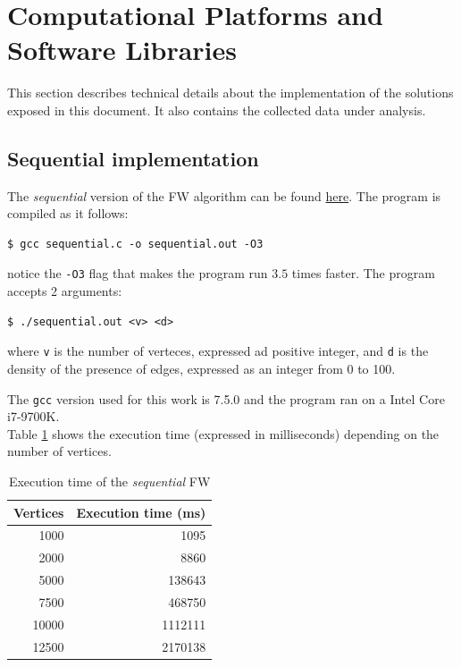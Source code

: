 \section{Computational Platforms and Software Libraries}
This section describes technical details about the implementation of the solutions exposed in this document. It also contains
the collected data under analysis.
\subsection{Sequential implementation}
The \emph{sequential} version of the FW algorithm can be found \href{https://github.com/firaja/Parallel-FloydWarshall/blob/master/sequential.c}{here}. 
The program is compiled as it follows:
\begin{lstlisting}[basicstyle=\footnotesize\ttfamily]
$ gcc sequential.c -o sequential.out -O3
\end{lstlisting}

notice the \texttt{-O3} flag that makes the program run $3.5$ times faster.
The program accepts 2 arguments:
\begin{lstlisting}[basicstyle=\footnotesize\ttfamily]
$ ./sequential.out <v> <d>
\end{lstlisting}
where \texttt{v} is the number of verteces, expressed ad positive integer, and \texttt{d} is the density of the presence of edges, expressed as an integer from 0 to 100.
\par
The \texttt{gcc} version used for this work is 7.5.0 and the program ran on a Intel Core i7-9700K. \\
Table \ref*{tab:seq-time} shows the execution time (expressed in milliseconds) depending on the number of vertices.


\begin{table}[h!]
\centering
\begin{tabular}{|r|r|}
\hline
\rowcolor[HTML]{3166FF} 
{\color[HTML]{FFFFFF} \textbf{Vertices}} & {\color[HTML]{FFFFFF} \textbf{Execution time (ms)}} \\ \hline
1000                                     & 1095                                                \\ \hline
2000                                     & 8860                                                \\ \hline
5000                                     & 138643                                              \\ \hline
7500                                     & 468750                                              \\ \hline
10000                                    & 1112111                                             \\ \hline
12500                                    & 2170138                                             \\ \hline
\end{tabular}
\caption{Execution time of the \emph{sequential} FW}                                                                                                                                            
\label{tab:seq-time} 
\end{table}

